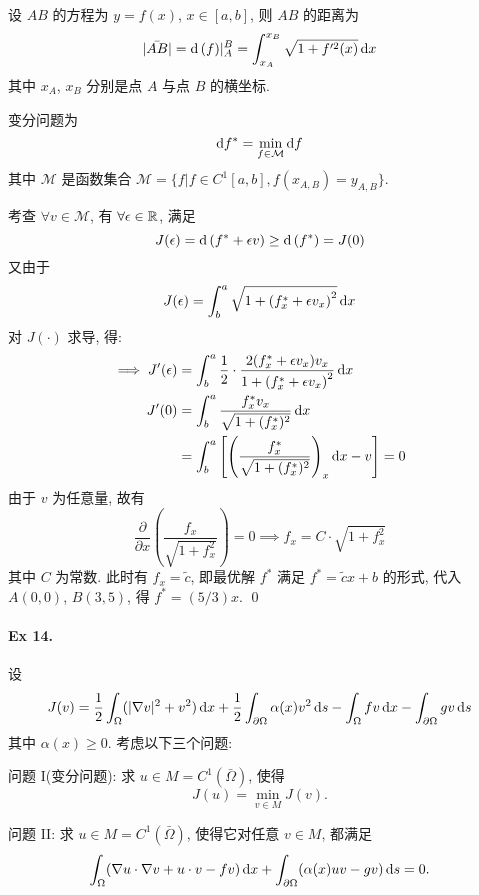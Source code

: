 \begin{solution}
设 $AB$ 的方程为 $y = f(x)$, $x \in [a, b]$, 则 $AB$ 的距离为
\[
|\bar{AB}| = \operatorname{d\!}\ (f)|_A^B = \int_{x_A}^{x_B} \sqrt{1 + f'^2(x)} \operatorname{d\!} x
\]
其中 $x_A$, $x_B$ 分别是点 $A$ 与点 $B$ 的横坐标.

变分问题为 
\[
\operatorname{d\!} f^* = \min_{f \in \mathcal M} \operatorname{d\!} f
\]
其中 $\mathcal M$ 是函数集合
$\mathcal M = \{f | f \in C^1[a, b], f(x_{A, B}) = y_{A, B}\}$.

考查 $\forall v \in \mathcal M$, 有 $\forall \epsilon \in {\mathbb R}$, 满足
\[
J(\epsilon) = \operatorname{d\!}\ (f^* + \epsilon v) \geq \operatorname{d\!}\ (f^*) = J(0)
\]
又由于
\[
J(\epsilon) = \int_b^a \sqrt{1 + \left(f^*_x + \epsilon v_x\right)^2} \operatorname{d\!} x
\]
对 $J(\cdot)$ 求导, 得:
\[ \begin{aligned}
\implies J'(\epsilon)
&= \int_b^a \frac{1}{2} \cdot
  \frac{2 (f^*_x + \epsilon v_x) v_x}{1 + \left(f^*_x + \epsilon v_x\right)^2}
  \operatorname{d\!} x \\
J'(0) &= \int_b^a
  \frac{f^*_x v_x}{\sqrt{1 + (f^*_x)^2}} \operatorname{d\!} x \\
&= \int_b^a
  \left[ \left( \frac{f^*_x}{\sqrt{1 + (f^*_x)^2}} \right)_x \operatorname{d\!} x - v \right]
  = 0
\end{aligned} \]
由于 $v$ 为任意量, 故有
\[
\frac{\partial}{\partial x}\left( \frac{f_x}{\sqrt{1 + f_x^2}} \right) = 0
\implies f_x = C \cdot \sqrt{1 + f_x^2}
\]
其中 $C$ 为常数. 此时有 $f_x = \tilde c$, 即最优解 $f^*$ 满足
$f^* = \tilde c x + b$ 的形式, 代入 $A(0, 0)$, $B(3, 5)$, 得 $f^* = (5 / 3) x$.
\qed
\end{solution}


\paragraph{Ex 14.}
设
\[
J(v) = \frac{1}{2} \int_{\Omega} (|\nabla v|^2 + v^2)\operatorname{d\!} x
+ \frac{1}{2} \int_{\partial \Omega} \alpha(x) v^2 \operatorname{d\!} s
- \int_{\Omega} fv \operatorname{d\!} x - \int_{\partial \Omega} gv \operatorname{d\!} s
\]
其中 $\alpha(x) \geq 0$. 考虑以下三个问题:

问题 I(变分问题): 求 $u \in M = C^1(\bar \Omega)$, 使得
\[
J(u)= \min_{v \in M} J(v).
\]

问题 II: 求 $u \in M = C^1(\bar \Omega)$, 使得它对任意 $v \in M$, 都满足
\[
\int_{\Omega} (\nabla u \cdot \nabla v + u \cdot v - fv)\operatorname{d\!} x
+ \int_{\partial \Omega} (\alpha(x) uv-gv )\operatorname{d\!} s = 0.
\]

